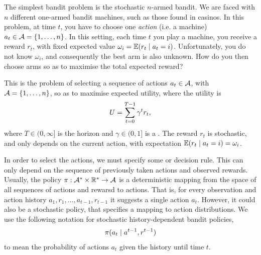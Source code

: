 The simplest bandit problem is the stochastic $n$-armed bandit. We are faced with $n$ different one-armed bandit machines, such as those found in casinos. In this problem, at time $t$, you have to choose one \emph{action} (i.e. a machine) $a_t \in {\mathcal{A}} = \left\{1, \ldots, n\right\}$. In this setting, each time $t$ you play a machine, you receive a reward $r_t$, with fixed expected value $\omega_i = \mathop{\mbox{\ensuremath{\mathbb{E}}}}\nolimits (r_t \mid a_t = i)$.
Unfortunately, you do not know $\omega_i$, and consequently the best arm is also unknown. How do you then choose arms so as to maximise the total expected reward? 
\begin{definition}
  This is the problem of selecting a sequence of actions $a_t \in {\mathcal{A}}$, with ${\mathcal{A}} = \left\{1, \ldots, n\right\}$, so as to maximise expected utility, where the utility is 
  \[
  U = \sum_{t=0}^{T - 1} \gamma^t r_t,
  \]
  where $T \in (0, \infty]$ is the horizon and $\gamma \in (0,1]$
  is a . The reward $r_t$ is stochastic,
  and only depends on the current action, with expectation $\mathop{\mbox{\ensuremath{\mathbb{E}}}}\nolimits(r_t
  \mid a_t = i) = \omega_i$.
\end{definition}
In order to select the actions, we must specify some  or decision rule. This can only depend on the sequence of previously taken actions and observed rewards. Usually, the policy $\pi :  {\mathcal{A}}^* \times {\mathbb{R}}^* \to {\mathcal{A}}$ is a deterministic mapping from the space of all sequences of actions and rewarsd to actions. That is, for every observation and action history $a_1, r_1, \ldots, a_{t-1}, r_{t-1}$ it suggests a single action $a_t$. However, it could also be a stochastic policy, that specifies a mapping to action distributions. We use the following notation for stochastic history-dependent bandit policies,
\begin{equation}
  \label{eq:history-dependent-bandit}
  \pi(a_t \mid a^{t-1}, r^{t-1})
\end{equation}
to mean the probability of actions $a_t$ given the history until time $t$.

